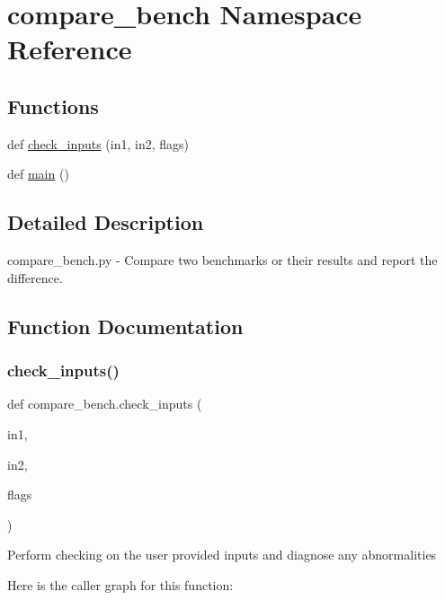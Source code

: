 \hypertarget{namespacecompare__bench}{}\section{compare\+\_\+bench Namespace Reference}
\label{namespacecompare__bench}
\subsection*{Functions}
\begin{DoxyCompactItemize}
\item 
def \mbox{\hyperlink{namespacecompare__bench_a5e90671fbe7113cf21c2b3f54ae0a858}{check\+\_\+inputs}} (in1, in2, flags)
\item 
def \mbox{\hyperlink{namespacecompare__bench_ae82bb21b1019ff4a8dd6692ebb99d0de}{main}} ()
\end{DoxyCompactItemize}


\subsection{Detailed Description}
\begin{DoxyVerb}compare_bench.py - Compare two benchmarks or their results and report the
           difference.
\end{DoxyVerb}
 

\subsection{Function Documentation}
\mbox{\label{namespacecompare__bench_a5e90671fbe7113cf21c2b3f54ae0a858}} 
\subsubsection{\texorpdfstring{check\+\_\+inputs()}{check\_inputs()}}
{\footnotesize\ttfamily def compare\+\_\+bench.\+check\+\_\+inputs (\begin{DoxyParamCaption}\item[{}]{in1,  }\item[{}]{in2,  }\item[{}]{flags }\end{DoxyParamCaption})}

\begin{DoxyVerb}Perform checking on the user provided inputs and diagnose any abnormalities
\end{DoxyVerb}
 Here is the caller graph for this function\+:
\mbox{\label{namespacecompare__bench_ae82bb21b1019ff4a8dd6692ebb99d0de}} 
